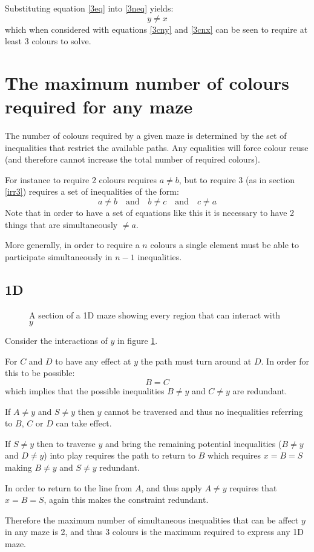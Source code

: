 \documentclass[10pt,twocolumn]{article}
\begin{document}
Substituting equation \ref{3eq} into \ref{3neq} yields:
\begin{equation}y \neq x \label{3ynx}\end{equation}
which when considered with equations \ref{3cny} and \ref{3cnx} can be seen to
require at least 3 colours to solve.

\section{The maximum number of colours required for any maze}
The number of colours required by a given maze is determined by the set of
inequalities that restrict the available paths.
Any equalities will force colour reuse (and therefore cannot increase the total
number of required colours).

For instance to require 2 colours requires $a \neq b$, but to require 3 (as in
section \ref{irr3}) requires a set of inequalities of the form:
\begin{equation}
a \neq b
\quad \textrm{and} \quad
b \neq c
\quad \textrm{and} \quad
c \neq a
\end{equation}
Note that in order to have a set of equations like this it is necessary to have
2 things that are simultaneously $\neq a$.

More generally, in order to require a $n$ colours a single element must be able
to participate simultaneously in $n-1$ inequalities.

\subsection{1D}
\begin{figure}
\caption{A section of a 1D maze showing every region that can interact with $y$}
\centering

\label{1dall}
\end{figure}
Consider the interactions of $y$ in figure \ref{1dall}.

For $C$ and $D$ to have any effect at $y$ the path must turn around at $D$.
In order for this to be possible:
\begin{equation} B = C \end{equation}
which implies that the possible inequalities $B \neq y$ and $C \neq y$ are
redundant.

If $A \neq y$ and $S \neq y$ then $y$ cannot be traversed and thus no
inequalities referring to $B$, $C$ or $D$ can take effect.

If $S \neq y$ then to traverse $y$ and bring the remaining potential
inequalities ($B \neq y$ and $D \neq y$) into play requires the path to return
to $B$ which requires $x = B = S$ making $B \neq y$ and $S \neq y$ redundant.

In order to return to the line from $A$, and thus apply $A \neq y$ requires
that $x = B = S$, again this makes the constraint redundant.

Therefore the maximum number of simultaneous inequalities that can be affect
$y$ in any maze is 2, and thus 3 colours is the maximum required to express
any 1D maze.
\end{document}
